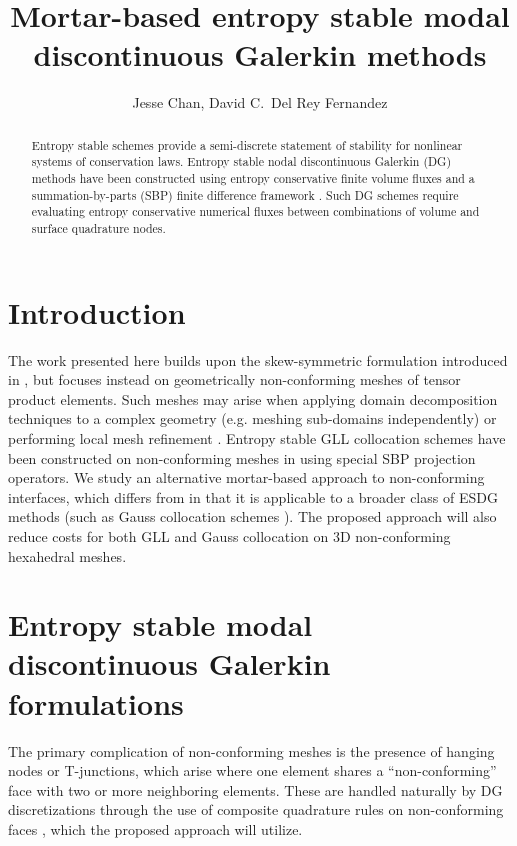 \documentclass[review]{siamart0216}
\author{Jesse Chan, David C.\ Del Rey Fernandez}
\title{Mortar-based entropy stable modal discontinuous Galerkin methods}
\newcommand{\note}[1]{{\color{blue}{#1}}}
\begin{document}
\maketitle

\begin{abstract}
Entropy stable schemes provide a semi-discrete statement of stability for nonlinear systems of conservation laws.  Entropy stable nodal discontinuous Galerkin (DG) methods have been constructed using entropy conservative finite volume fluxes \cite{tadmor1987numerical} and a summation-by-parts (SBP) finite difference framework \cite{gassner2013skew, carpenter2014entropy, gassner2016split, chen2017entropy, crean2018entropy, chan2017discretely, chan2018efficient}.  Such DG schemes require evaluating entropy conservative numerical fluxes between combinations of volume and surface quadrature nodes.  
\end{abstract}

\section{Introduction}

\note{Boilerplate introduction on high order + stability}

The work presented here builds upon the skew-symmetric formulation introduced in \cite{chan2019skew}, but focuses instead on geometrically non-conforming meshes of tensor product elements.  Such meshes may arise when applying domain decomposition techniques to a complex geometry (e.g. meshing sub-domains independently)  \cite{maday1989non, bernardi1993domain} or performing local mesh refinement \cite{staten2010hexahedral}.  Entropy stable GLL collocation schemes have been constructed on non-conforming meshes in \cite{friedrich2017entropy} using special SBP projection operators.  We study an alternative mortar-based approach to non-conforming interfaces, which differs from \cite{friedrich2017entropy} in that it is applicable to a broader class of ESDG methods (such as Gauss collocation schemes \cite{chan2018efficient}).  The proposed approach will also reduce costs for both GLL and Gauss collocation on 3D non-conforming hexahedral meshes.  

\section{Entropy stable modal discontinuous Galerkin formulations}

The primary complication of non-conforming meshes is the presence of hanging nodes or T-junctions, which arise where one element shares a ``non-conforming'' face with two or more neighboring elements.  These are handled naturally by DG discretizations through the use of composite quadrature rules on non-conforming faces \cite{bui2012analysis, Kozdon2018}, which the proposed approach will utilize.  
\end{document}
